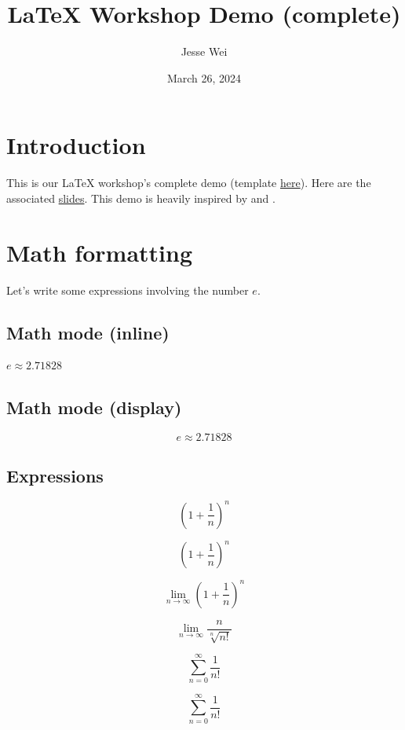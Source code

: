 \documentclass{article}
\title{\LaTeX{} Workshop Demo (complete)}
\author{Jesse Wei}
\date{March 26, 2024}
\begin{document}
\maketitle

\tableofcontents
\newpage

\section{Introduction}

This is our \LaTeX{} workshop's complete demo (template \href{https://www.overleaf.com/read/tmgncmqywbdj#3f2451}{here}). Here are the associated \href{https://docs.google.com/presentation/d/1zO6tLPnshC0WfSBvqL2mZKDLLprnuQr2t1IMmsjBdlM/edit?usp=sharing}{slides}. This demo is heavily inspired by \cite{latex_vid_1} and \cite{latex_vid_2}.

\section{Math formatting}

Let's write some expressions involving the number $e$.

\subsection{Math mode (inline)}

$e\approx2.71828$

\subsection{Math mode (display)}

$$e\approx2.71828$$

\subsection{Expressions}

$$(1+\frac{1}{n})^n$$

$$\left(1+\frac{1}{n}\right)^n$$

$$\lim_{n\to\infty}\left(1+\frac{1}{n}\right)^n$$

$$\lim_{n\to\infty}\frac{n}{\sqrt[n]{n!}}$$

$$\sum_{n=0}^{\infty}\frac{1}{n!}$$

\begin{equation}
    \label{esum}
    \sum_{n=0}^{\infty}\frac{1}{n!}
\end{equation}
\end{document}
